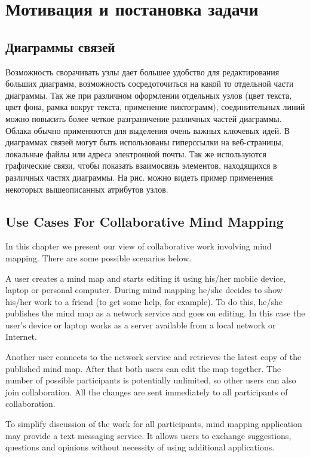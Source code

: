 \newpage

\chapter{Мотивация и постановка задачи}\label{ch:chapter_1}

\section{Диаграммы связей}

Возможность сворачивать узлы дает большее удобство для редактирования больших
диаграмм, возможность сосредоточиться на какой то отдельной части диаграммы. Так
же при различном оформлении отдельных узлов (цвет текста, цвет фона, рамка
вокруг текста, применение пиктограмм), соединительных линий можно повысить более
четкое разграничение различных частей диаграммы. Облака обычно применяются для
выделения очень важных ключевых идей. В диаграммах связей могут быть
использованы гиперссылки на веб-страницы, локальные файлы или адреса электронной
почты. Так же используются графические связи, чтобы показать взаимосвязь
элементов, находящихся в различных частях диаграммы. На рис. можно видеть пример
применения некоторых вышеописанных атрибутов узлов.

\section{Use Cases For Collaborative Mind Mapping}
\label{collaboration-consept}
In this chapter we present our view of collaborative work involving mind
mapping. There are some possible scenarios below.

A user creates a mind map and starts editing it using his/her mobile device,
laptop or personal computer. During mind mapping he/she decides to show his/her
work to a friend (to get some help, for example).  To do this, he/she publishes
the mind map as a network service and goes on editing. In this case the user's
device or laptop works as a server available from a local network or Internet.

Another user connects to the network service and retrieves the latest copy of
the published mind map. After that both users can edit the map together. The
number of possible participants is potentially unlimited, so other users can
also join collaboration. All the changes are sent immediately to all
participants of collaboration.

To simplify discussion of the work for all participants, mind mapping
application may provide a text messaging service. It allows users to exchange
suggestions, questions and opinions without necessity of using additional
applications.


